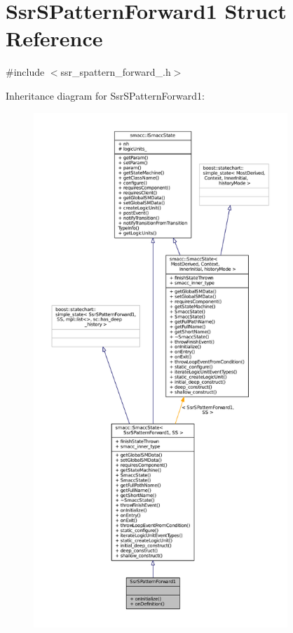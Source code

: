 \hypertarget{structSsrSPatternForward1}{}\section{Ssr\+S\+Pattern\+Forward1 Struct Reference}
\label{structSsrSPatternForward1}


{\ttfamily \#include $<$ssr\+\_\+spattern\+\_\+forward\+\_.\+h$>$}



Inheritance diagram for Ssr\+S\+Pattern\+Forward1\+:
\nopagebreak
\begin{figure}[H]
\begin{center}
\leavevmode
\includegraphics[height=550pt]{structSsrSPatternForward1__inherit__graph}
\end{center}
\end{figure}


